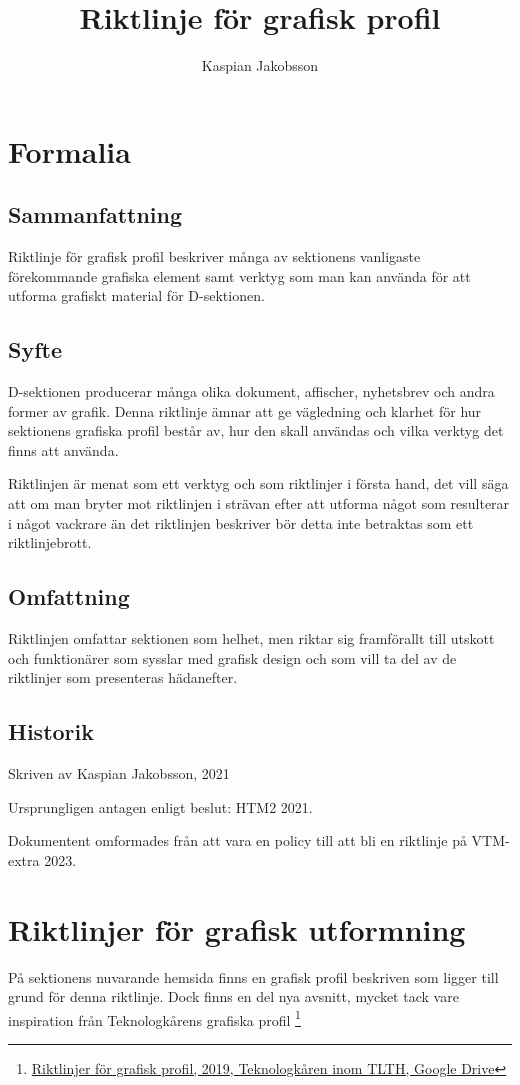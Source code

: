 \documentclass[]{dsekprotokoll}
\title{Riktlinje för grafisk profil}
\author{Kaspian Jakobsson}
\begin{document}
\maketitle

\section{Formalia}

\subsection{Sammanfattning}
Riktlinje för grafisk profil beskriver många av sektionens vanligaste förekommande grafiska element samt verktyg som man kan använda för att utforma grafiskt material för D-sektionen.

\subsection{Syfte}
D-sektionen producerar många olika dokument, affischer, nyhetsbrev och andra former av grafik. Denna riktlinje ämnar att ge vägledning och klarhet för hur sektionens grafiska profil består av, hur den skall användas och vilka verktyg det finns att använda.

Riktlinjen är menat som ett verktyg och som riktlinjer i första hand, det vill säga att om man bryter mot riktlinjen i strävan efter att utforma något som resulterar i något vackrare än det riktlinjen beskriver bör detta inte betraktas som ett riktlinjebrott.

\subsection{Omfattning}
Riktlinjen omfattar sektionen som helhet, men riktar sig framförallt till utskott och funktionärer som sysslar med grafisk design och som vill ta del av de riktlinjer som presenteras hädanefter.


\subsection{Historik}
Skriven av Kaspian Jakobsson, 2021

Ursprungligen antagen enligt beslut:
HTM2 2021.

Dokumentent omformades från att vara en policy till att bli en riktlinje på VTM-extra 2023.


\section{Riktlinjer för grafisk utformning}
På sektionens nuvarande hemsida finns en grafisk profil beskriven som ligger till grund för denna riktlinje. Dock finns en del nya avsnitt, mycket tack vare inspiration från Teknologkårens grafiska profil \footnote{\href{https://drive.google.com/file/d/1EFdTyU6aXKSBEj4cqcDsR325LMzTP_um/view}{Riktlinjer för grafisk profil, 2019, Teknologkåren inom TLTH, Google Drive}}
\end{document}
